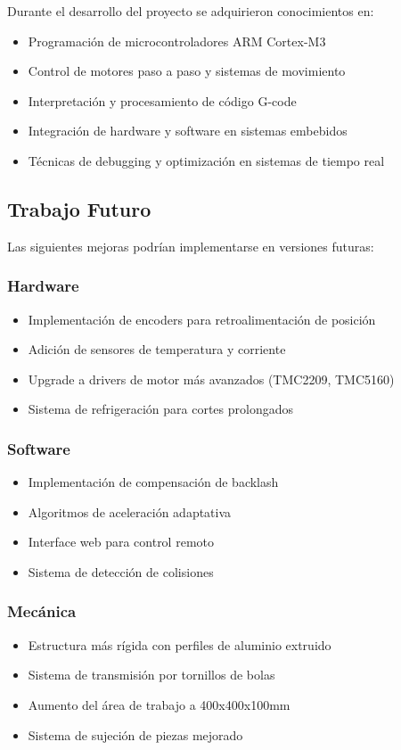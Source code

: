\documentclass[12pt]{article}
\begin{document}
Durante el desarrollo del proyecto se adquirieron conocimientos en:
\begin{itemize}
    \item Programación de microcontroladores ARM Cortex-M3
    \item Control de motores paso a paso y sistemas de movimiento
    \item Interpretación y procesamiento de código G-code
    \item Integración de hardware y software en sistemas embebidos
    \item Técnicas de debugging y optimización en sistemas de tiempo real
\end{itemize}

\subsection{Trabajo Futuro}

Las siguientes mejoras podrían implementarse en versiones futuras:

\subsubsection{Hardware}
\begin{itemize}
    \item Implementación de encoders para retroalimentación de posición
    \item Adición de sensores de temperatura y corriente
    \item Upgrade a drivers de motor más avanzados (TMC2209, TMC5160)
    \item Sistema de refrigeración para cortes prolongados
\end{itemize}

\subsubsection{Software}
\begin{itemize}
    \item Implementación de compensación de backlash
    \item Algoritmos de aceleración adaptativa
    \item Interface web para control remoto
    \item Sistema de detección de colisiones
\end{itemize}

\subsubsection{Mecánica}
\begin{itemize}
    \item Estructura más rígida con perfiles de aluminio extruido
    \item Sistema de transmisión por tornillos de bolas
    \item Aumento del área de trabajo a 400x400x100mm
    \item Sistema de sujeción de piezas mejorado
\end{itemize}
\end{document}

